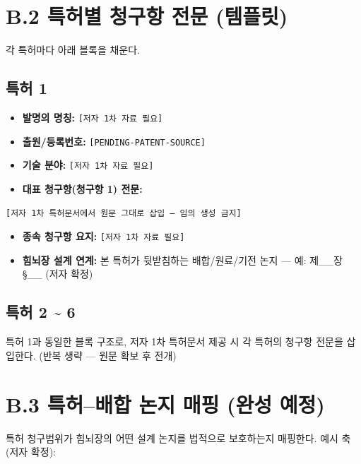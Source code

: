 \documentclass[12pt,oneside]{book}
\newenvironment{authnote}
  {\par\smallskip\begingroup\leftskip=6mm\rightskip=3mm\small\color{muted}\noindent\ignorespaces}
  {\par\endgroup\smallskip}
\begin{document}
\section{B.2 특허별 청구항 전문 (템플릿)}

각 특허마다 아래 블록을 채운다.

\subsection{특허 1}

\begin{itemize}[leftmargin=6mm,itemsep=1pt,topsep=2pt]
  \item \textbf{발명의 명칭:} \texttt{[저자 1차 자료 필요]}
  \item \textbf{출원/등록번호:} \texttt{[PENDING-PATENT-SOURCE]}
  \item \textbf{기술 분야:} \texttt{[저자 1차 자료 필요]}
  \item \textbf{대표 청구항(청구항 1) 전문:}
\end{itemize}

\begin{authnote}\texttt{[저자 1차 특허문서에서 원문 그대로 삽입 — 임의 생성 금지]}\end{authnote}

\begin{itemize}[leftmargin=6mm,itemsep=1pt,topsep=2pt]
  \item \textbf{종속 청구항 요지:} \texttt{[저자 1차 자료 필요]}
  \item \textbf{힘뇌장 설계 연계:} 본 특허가 뒷받침하는 배합/원료/기전 논지 — 예: 제\_\_장 §\_\_ (저자 확정)
\end{itemize}

\subsection{특허 2 \textasciitilde{} 6}

\begin{authnote}특허 1과 동일한 블록 구조로, 저자 1차 특허문서 제공 시 각 특허의 청구항 전문을 삽입한다. (반복 생략 — 원문 확보 후 전개)\end{authnote}

\section{B.3 특허–배합 논지 매핑 (완성 예정)}

특허 청구범위가 힘뇌장의 어떤 설계 논지를 법적으로 보호하는지 매핑한다. 예시 축(저자 확정):
\end{document}
